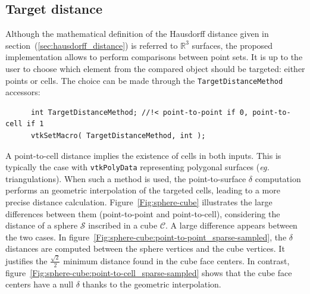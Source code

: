 \documentclass{InsightArticle}
\begin{document}
\subsection{Target distance}
%
Although the mathematical definition of the Hausdorff distance given in section~(\ref{sec:hausdorff_distance}) is referred to $\mathbb{R}^3$  surfaces, the proposed implementation allows to perform comparisons between point sets. It is up to the user to choose which element from the compared object should be targeted: either points or cells. The choice can be made through the \verb!TargetDistanceMethod! accessors:
\begin{verbatim}
      int TargetDistanceMethod; //!< point-to-point if 0, point-to-cell if 1
      vtkSetMacro( TargetDistanceMethod, int );
\end{verbatim}
A point-to-cell distance implies the existence of cells in both inputs. This is typically the case with \verb!vtkPolyData! representing polygonal surfaces (\textit{eg.} triangulations). When such a method is used, the point-to-surface $\delta$ computation performs an geometric interpolation of the targeted cells, leading to a more precise distance calculation.  Figure~\ref{Fig:sphere-cube} illustrates the large differences between them (point-to-point and point-to-cell), considering the distance of a sphere $\mathcal{S}$ inscribed in a cube $\mathcal{C}$. A large difference appears between the two cases. In figure~\ref{Fig:sphere-cube:point-to-point_sparse-sampled}, the $\delta$ distances are computed between the sphere vertices and the cube vertices. It justifies the $\frac{\sqrt{2}}{2}$ minimum distance found in the cube face centers. In contrast, figure~\ref{Fig:sphere-cube:point-to-cell_sparse-sampled} shows that the cube face centers have a null $\delta$ thanks to the geometric interpolation.
%
\end{document}
